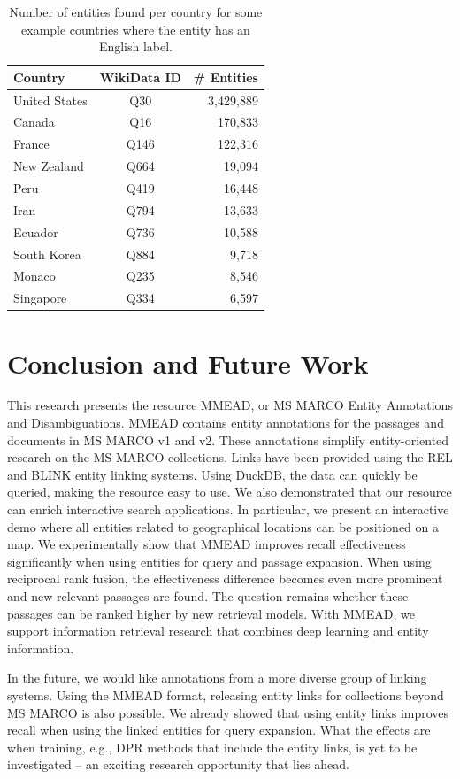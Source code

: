 \begin{table}[]
	\caption{Number of entities found per country for some example countries where the entity has an English label.}
	\label{tab:country_entities}
	\centering
	\begin{tabular}{l|c|r}
		\toprule
		Country & WikiData ID & \# Entities\\
		\midrule
		United States & Q30 & 3,429,889 \\
		Canada & Q16 & 170,833 \\
		France & Q146 & 122,316 \\
		New Zealand & Q664 & 19,094\\
		Peru & Q419 & 16,448 \\
		Iran & Q794 & 13,633\\
		Ecuador & Q736 & 10,588 \\
		South Korea & Q884 & 9,718\\
		Monaco & Q235 & 8,546\\
		Singapore & Q334 & 6,597\\
		\bottomrule
	\end{tabular}
\end{table}

\section{Conclusion and Future Work}
This research presents the resource MMEAD, or MS MARCO Entity Annotations and Disambiguations. MMEAD contains entity annotations for the passages and documents in MS MARCO v1 and v2. These annotations simplify entity-oriented research on the MS MARCO collections. Links have been provided using the REL and BLINK entity linking systems. Using DuckDB, the data can quickly be queried, making the resource easy to use. 
We also demonstrated that our resource can enrich interactive search applications. In particular, we present an interactive demo where all entities related to geographical locations can be positioned on a map. We experimentally show that MMEAD improves recall effectiveness significantly when using entities for query and passage expansion. When using reciprocal rank fusion, the effectiveness difference becomes even more prominent and new relevant passages are found. The question remains whether these passages can be ranked higher by new retrieval models. With MMEAD, we support information retrieval research that combines deep learning and entity information. 

In the future, we would like annotations from a more diverse group of linking systems. Using the MMEAD format, releasing entity links for collections beyond MS MARCO is also possible. We already showed that using entity links improves recall when using the linked entities for query expansion. What the effects are when training, e.g., DPR methods that include the entity links, is yet to be investigated -- an exciting research opportunity that lies ahead. 
